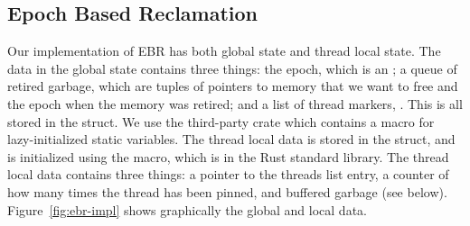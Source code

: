 \documentclass[b5paper]{report}
\begin{document}
\subsection{Epoch Based Reclamation}

Our implementation of EBR has both global state and thread local state. The data
in the global state contains three things: the epoch, which is an
; a queue of retired garbage, which are tuples of pointers to
memory that we want to free and the epoch when the memory was retired; and a
list of thread markers, . This is all stored in the
 struct. We use the third-party crate 
which contains a macro for lazy-initialized static variables. The thread local
data is stored in the  struct, and is initialized using the
 macro, which is in the Rust standard library. The thread
local data contains three things: a pointer to the threads list entry, a counter
of how many times the thread has been pinned, and buffered garbage (see below).
Figure~\ref{fig:ebr-impl} shows graphically the global and local data.
\end{document}
